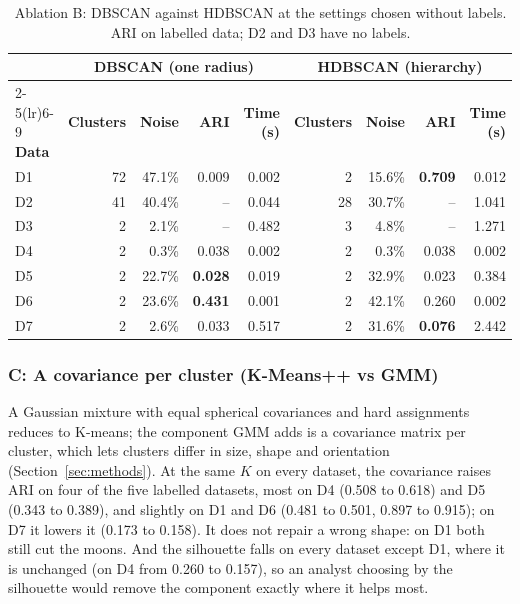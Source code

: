 \begin{table}[h]\centering\small
\caption{Ablation B: DBSCAN against HDBSCAN at the settings chosen without labels. ARI on labelled data;
D2 and D3 have no labels.}
\label{tab:abl_hierarchy}
\begin{tabular}{lrrrrrrrr}
\toprule
& \multicolumn{4}{c}{\textbf{DBSCAN (one radius)}} & \multicolumn{4}{c}{\textbf{HDBSCAN (hierarchy)}} \\
\cmidrule(lr){2-5}\cmidrule(lr){6-9}
\textbf{Data} & \textbf{Clusters} & \textbf{Noise} & \textbf{ARI} & \textbf{Time (s)}
& \textbf{Clusters} & \textbf{Noise} & \textbf{ARI} & \textbf{Time (s)} \\
\midrule
D1 & 72 & 47.1\% & 0.009 & 0.002 & 2  & 15.6\% & \textbf{0.709} & 0.012 \\
D2 & 41 & 40.4\% & --    & 0.044 & 28 & 30.7\% & --    & 1.041 \\
D3 & 2  & 2.1\%  & --    & 0.482 & 3  & 4.8\%  & --    & 1.271 \\
D4 & 2  & 0.3\%  & 0.038 & 0.002 & 2  & 0.3\%  & 0.038 & 0.002 \\
D5 & 2  & 22.7\% & \textbf{0.028} & 0.019 & 2  & 32.9\% & 0.023 & 0.384 \\
D6 & 2  & 23.6\% & \textbf{0.431} & 0.001 & 2  & 42.1\% & 0.260 & 0.002 \\
D7 & 2  & 2.6\%  & 0.033 & 0.517 & 2  & 31.6\% & \textbf{0.076} & 2.442 \\
\bottomrule
\end{tabular}
\end{table}

\subsubsection{C: A covariance per cluster (K-Means++ vs GMM)}\label{sec:abl_covariance}
A Gaussian mixture with equal spherical covariances and hard assignments reduces to K-means; the component
GMM adds is a covariance matrix per cluster, which lets clusters differ in size, shape and orientation
(Section~\ref{sec:methods}). At the same $K$ on every dataset, the covariance raises ARI on four of the
five labelled datasets, most on D4 (0.508 to 0.618) and D5 (0.343 to 0.389), and slightly on D1 and D6
(0.481 to 0.501, 0.897 to 0.915); on D7 it lowers it (0.173 to 0.158). It does not repair a wrong shape:
on D1 both still cut the moons. And the silhouette falls on every dataset except D1, where it is unchanged
(on D4 from 0.260 to 0.157), so an analyst choosing by the silhouette would remove the component exactly
where it helps most.


